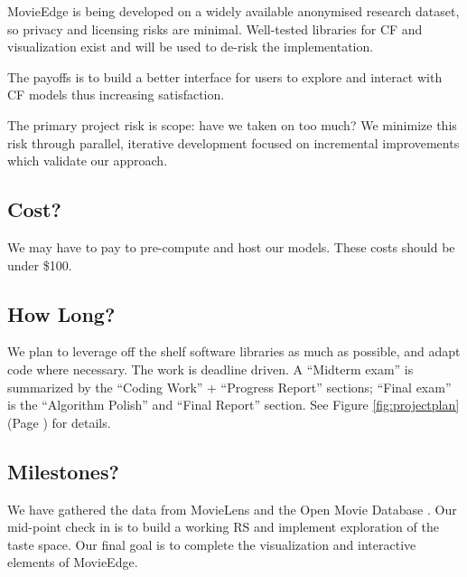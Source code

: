MovieEdge is being developed on a widely available anonymised research dataset, so privacy and licensing risks are minimal. Well-tested libraries for CF and visualization exist and will be used to de-risk the implementation. 

The payoffs is to build a better interface for users to explore and interact with CF models thus increasing satisfaction. 

The primary project risk is scope: have we taken on too much?   We minimize this risk through parallel, iterative development focused on  incremental improvements which validate our approach.

\subsection{Cost?}
We may have to pay to pre-compute and host our models. These costs should be under \$100.

\subsection{How Long?}
We plan to leverage off the shelf software libraries as much as possible, and adapt code where necessary. The work is deadline driven.  A “Midterm exam” is summarized by the “Coding Work” + “Progress Report” sections; “Final exam” is the “Algorithm Polish” and “Final Report” section.  See Figure \ref{fig:projectplan} (Page \pageref{fig:projectplan}) for details.

\subsection{Milestones?}
We have gathered the data from MovieLens \cite{harper2016movielens} and the Open Movie Database \cite{openMovieDB}. Our mid-point check in is to build a working RS and implement exploration of the taste space. Our final goal is to complete the visualization and interactive elements of MovieEdge.

